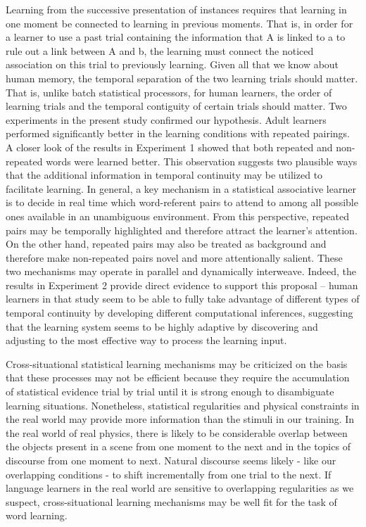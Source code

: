 \documentclass[man,floatsintext]{apa6}
\begin{document}
Learning from the successive presentation of instances requires that learning in one moment be connected to learning in previous moments. That is, in order for a learner to use a past trial containing the information that A is linked to a to rule out a link between A and b, the learning must connect the noticed association on this trial to previously learning. Given all that we know about human memory, the temporal separation of the two learning trials should matter. That is, unlike batch statistical processors, for human learners, the order of learning trials and the temporal contiguity of certain trials should matter. Two experiments in the present study confirmed our hypothesis. Adult learners performed significantly better in the learning conditions with repeated pairings. A closer look of the results in Experiment 1 showed that both repeated and non-repeated words were learned better. This observation suggests two plausible ways that the additional information in temporal continuity may be utilized to facilitate learning. In general, a key mechanism in a statistical associative learner is to decide in real time which word-referent pairs to attend to among all possible ones available in an unambiguous environment. From this perspective, repeated pairs may be temporally highlighted and therefore attract the learner's attention. On the other hand, repeated pairs may also be treated as background and therefore make non-repeated pairs novel and more attentionally salient. These two mechanisms may operate in parallel and dynamically interweave. Indeed, the results in Experiment 2 provide direct evidence to support this proposal -- human learners in that study seem to be able to fully take advantage of different types of temporal continuity by developing different computational inferences, suggesting that the learning system seems to be highly adaptive by discovering and adjusting to the most effective way to process the learning input.

Cross-situational statistical learning mechanisms may be criticized on the basis that these processes may not be efficient because they require the accumulation of statistical evidence trial by trial until it is strong enough to disambiguate learning situations. Nonetheless, statistical regularities and physical constraints in the real world may provide more information than the stimuli in our training. In the real world of real physics, there is likely to be considerable overlap between the objects present in a scene from one moment to the next and in the topics of discourse from one moment to next. Natural discourse seems likely - like our overlapping conditions - to shift incrementally from one trial to the next. If language learners in the real world are sensitive to overlapping regularities as we suspect, cross-situational learning mechanisms may be well fit for the task of word learning.
\end{document}
